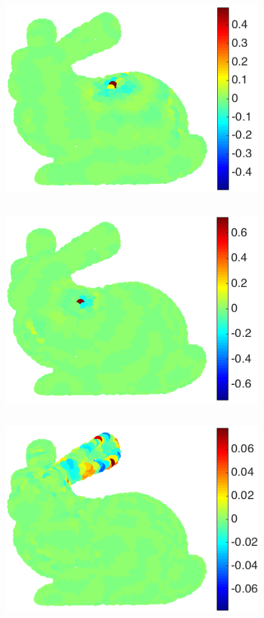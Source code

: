 \documentclass{article}
\begin{document}
\begin{figure}[bth]
\begin{minipage}[m]{0.16\linewidth}
\end{minipage}
\begin{minipage}[m]{0.16\linewidth}
\centerline{~~\includegraphics[width=.85\linewidth]{fig_bunny_atom_wav1a}}
\end{minipage}
\begin{minipage}[m]{0.16\linewidth}
\centerline{~~\includegraphics[width=.85\linewidth]{fig_bunny_atom_wav2a}}
\end{minipage}
\begin{minipage}[m]{0.16\linewidth}
\centerline{~~\includegraphics[width=.85\linewidth]{fig_bunny_atom_wav3a}}

\end{minipage}
\end{figure}
\end{document}
